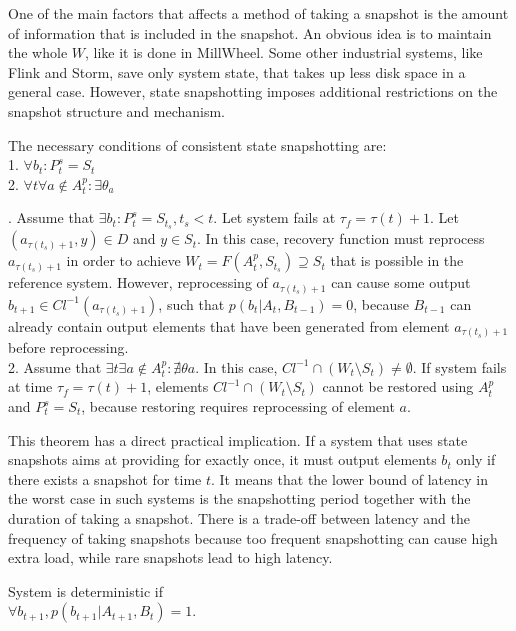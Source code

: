 One of the main factors that affects a method of taking a snapshot is the amount of information that is included in the snapshot. An obvious idea is to maintain the whole $W$, like it is done in MillWheel. Some other industrial systems, like Flink and Storm, save only system state, that takes up less disk space in a general case. However, state snapshotting imposes additional restrictions on the snapshot structure and mechanism.

\begin{theorem}
\label{necessary_conditions}
The necessary conditions of consistent state snapshotting are:\\
1. $\forall{b_t}:P^{s}_t=S_t$\\
2. $\forall{t}\forall{a}\notin{A^{p}_t} : \exists{\theta_a}$
\end{theorem}
\begin{sketch}
$ $. Assume that $\exists{b_t}:P^{s}_t = S_{t_s}, t_s < t$. Let system fails at $\tau_f = \tau(t)+1$. Let $(a_{\tau(t_s)+1},y)\in{D}$ and $y\in{S_t}$. In this case, recovery function must reprocess $a_{\tau(t_s)+1}$ in order to achieve $W_t=F(A^{p}_t,S_{t_s})\supseteq{S_t}$ that is possible in the reference system. However, reprocessing of $a_{\tau(t_s)+1}$ can cause some output $ b_{t+1}\in{Cl^{-1}(a_{\tau(t_s)+1})}$, such that $p(b_{t}|A_t,B_{t-1})=0$, because $B_{t-1}$ can already contain output elements that have been generated from element $a_{\tau(t_s)+1}$ before reprocessing. \\
2. Assume that $\exists{t} \exists{a} \notin{A^{p}_t}:\nexists{\theta{a}}$. In this case, $Cl^{-1} \cap (W_t \setminus{S_t}) \neq \emptyset$. If system fails at time $\tau_f=\tau(t)+1$, elements $Cl^{-1} \cap (W_t \setminus{S_t})$ cannot be restored using $A^{p}_t$ and $P^{s}_t=S_t$, because restoring requires reprocessing of element $a$.
\end{sketch}

This theorem has a direct practical implication. If a system that uses state snapshots aims at providing for exactly once, it must output elements $b_t$ only if there exists a snapshot for time $t$. It means that the lower bound of latency in the worst case in such systems is the snapshotting period together with the duration of taking a snapshot. There is a trade-off between latency and the frequency of taking snapshots because too frequent snapshotting can cause high extra load, while rare snapshots lead to high latency.

\begin{definition}{System is deterministic}
if\\ 
$\forall{b_{t+1}},p(b_{t+1}|A_{t+1},B_t)=1$.
\end{definition}

